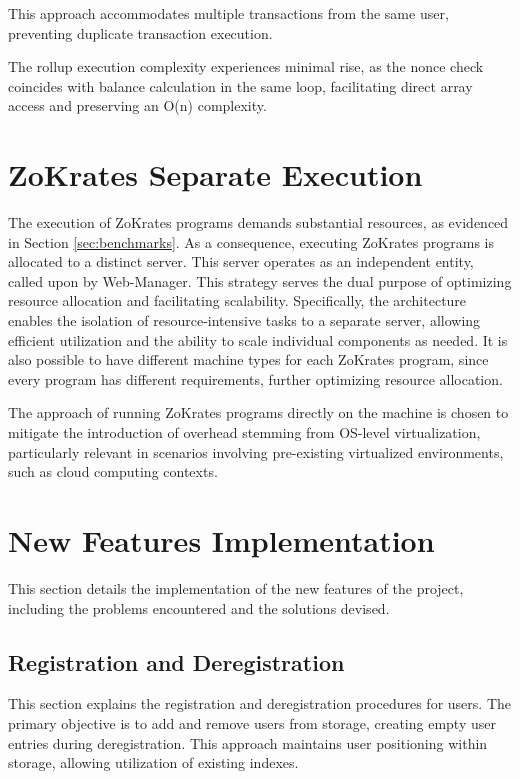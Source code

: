 This approach accommodates multiple transactions from the same user, preventing duplicate transaction execution.

The rollup execution complexity experiences minimal rise, as the nonce check coincides with balance calculation in the same loop, facilitating direct array access and preserving an O(n) complexity.

\section{ZoKrates Separate Execution}
The execution of ZoKrates programs demands substantial resources, as evidenced in Section \ref{sec:benchmarks}. As a consequence, executing ZoKrates programs is allocated to a distinct server. This server operates as an independent entity, called upon by Web-Manager. This strategy serves the dual purpose of optimizing resource allocation and facilitating scalability. Specifically, the architecture enables the isolation of resource-intensive tasks to a separate server, allowing efficient utilization and the ability to scale individual components as needed. It is also possible to have different machine types for each ZoKrates program, since every program has different requirements, further optimizing resource allocation.

The approach of running ZoKrates programs directly on the machine is chosen to mitigate the introduction of overhead stemming from OS-level virtualization, particularly relevant in scenarios involving pre-existing virtualized environments, such as cloud computing contexts.

\section{New Features Implementation}

This section details the implementation of the new features of the project, including the problems encountered and the solutions devised.

\subsection{Registration and Deregistration}

This section explains the registration and deregistration procedures for users. The primary objective is to add and remove users from storage, creating empty user entries during deregistration. This approach maintains user positioning within storage, allowing utilization of existing indexes.

